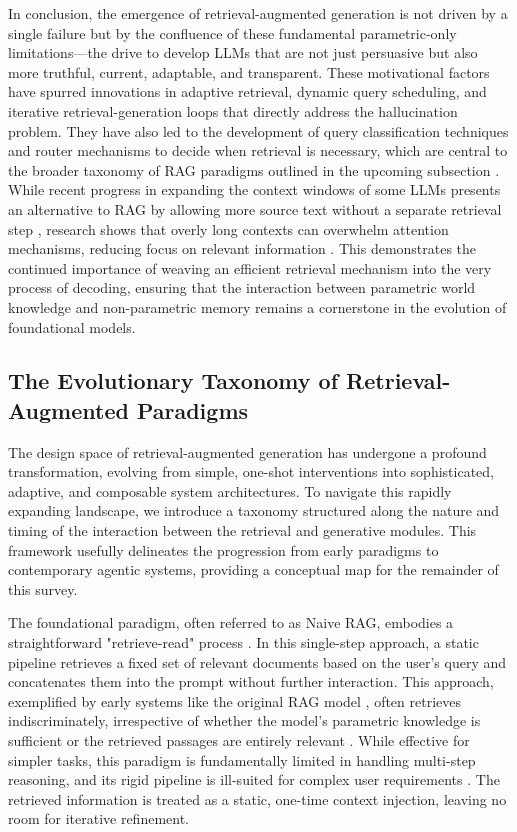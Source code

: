 \documentclass[11pt,a4paper]{article}
\begin{document}
In conclusion, the emergence of retrieval-augmented generation is not driven by a single failure but by the confluence of these fundamental parametric-only limitations---the drive to develop LLMs that are not just persuasive but also more truthful, current, adaptable, and transparent. These motivational factors have spurred innovations in adaptive retrieval, dynamic query scheduling, and iterative retrieval-generation loops that directly address the hallucination problem. They have also led to the development of query classification techniques and router mechanisms to decide when retrieval is necessary, which are central to the broader taxonomy of RAG paradigms outlined in the upcoming subsection \cite{arxiv:2407.16833v1}. While recent progress in expanding the context windows of some LLMs presents an alternative to RAG by allowing more source text without a separate retrieval step \cite{arxiv:2407.16833v1}, research shows that overly long contexts can overwhelm attention mechanisms, reducing focus on relevant information \cite{arxiv:2409.01666v1}. This demonstrates the continued importance of weaving an efficient retrieval mechanism into the very process of decoding, ensuring that the interaction between parametric world knowledge and non-parametric memory remains a cornerstone in the evolution of foundational models.


\subsection{The Evolutionary Taxonomy of Retrieval-Augmented Paradigms}


The design space of retrieval-augmented generation has undergone a profound transformation, evolving from simple, one-shot interventions into sophisticated, adaptive, and composable system architectures. To navigate this rapidly expanding landscape, we introduce a taxonomy structured along the nature and timing of the interaction between the retrieval and generative modules. This framework usefully delineates the progression from early paradigms to contemporary agentic systems, providing a conceptual map for the remainder of this survey.

The foundational paradigm, often referred to as Naive RAG, embodies a straightforward "retrieve-read" process \cite{arxiv:2312.10997v5}. In this single-step approach, a static pipeline retrieves a fixed set of relevant documents based on the user's query and concatenates them into the prompt without further interaction. This approach, exemplified by early systems like the original RAG model \cite{arxiv:2005.11401v4}, often retrieves indiscriminately, irrespective of whether the model's parametric knowledge is sufficient or the retrieved passages are entirely relevant \cite{arxiv:2310.11511v1}. While effective for simpler tasks, this paradigm is fundamentally limited in handling multi-step reasoning, and its rigid pipeline is ill-suited for complex user requirements \cite{arxiv:2403.14403v2}. The retrieved information is treated as a static, one-time context injection, leaving no room for iterative refinement.
\end{document}

